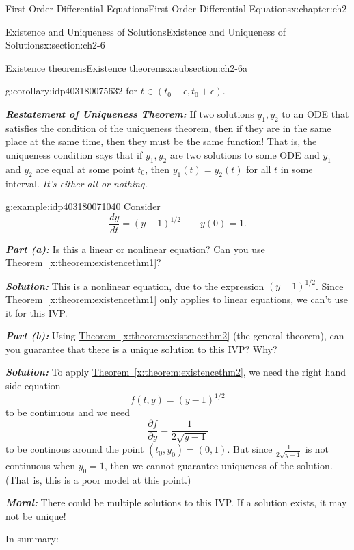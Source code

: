 \documentclass[oneside,10pt,]{book}
\newcommand{\xreffont}{\relax}
\newcommand{\alert}[1]{\textbf{\textit{#1}}}
\numberwithin{equation}{section}
\numberwithin{equation}{section}
\begin{document}
\begin{chapterptx}{First Order Differential Equations}{}{First Order Differential Equations}{}{}{x:chapter:ch2}
\begin{sectionptx}{Existence and Uniqueness of Solutions}{}{Existence and Uniqueness of Solutions}{}{}{x:section:ch2-6}
\begin{subsectionptx}{Existence theorems}{}{Existence theorems}{}{}{x:subsection:ch2-6a}
\begin{corollary}{}{}{g:corollary:idp403180075632}
for \(t\in\left(t_{0}-\epsilon,t_{0}+\epsilon\right)\).%
\end{corollary}
\alert{Restatement of Uniqueness Theorem:} If two solutions \(y_{1},y_{2}\) to an ODE that satisfies the condition of the uniqueness theorem, then if they are in the same place at the same time, then they must be the same function! That is, the uniqueness condition says that if \(y_{1},y_{2}\) are two solutions to some ODE and \(y_{1}\) and \(y_{2}\) are equal at some point \(t_{0}\), then \(y_{1}(t)=y_{2}(t)\) for all \(t\) in some interval. \emph{It's either all or nothing.}%
\begin{example}{}{g:example:idp403180071040}%
Consider%
\begin{equation*}
\frac{dy}{dt}=(y-1)^{1/2}\qquad y(0)=1.
\end{equation*}
%
\par
\alert{Part (a):} Is this a linear or nonlinear equation? Can you use \hyperref[x:theorem:existencethm1]{Theorem~{\xreffont\ref{x:theorem:existencethm1}}}?%
\par
\alert{Solution:} This is a nonlinear equation, due to the expression \((y-1)^{1/2}\). Since \hyperref[x:theorem:existencethm1]{Theorem~{\xreffont\ref{x:theorem:existencethm1}}} only applies to linear equations, we can't use it for this IVP.%
\par
\alert{Part (b):} Using \hyperref[x:theorem:existencethm2]{Theorem~{\xreffont\ref{x:theorem:existencethm2}}} (the general theorem), can you guarantee that there is a unique solution to this IVP? Why?%
\par
\alert{Solution:} To apply \hyperref[x:theorem:existencethm2]{Theorem~{\xreffont\ref{x:theorem:existencethm2}}}, we need the right hand side equation%
\begin{equation*}
f(t,y)=(y-1)^{1/2}
\end{equation*}
to be continuous and we need%
\begin{equation*}
\frac{\partial f}{\partial y}=\frac{1}{2\sqrt{y-1}}
\end{equation*}
to be continous around the point \((t_{0},y_{0})=(0,1)\). But since \(\frac{1}{2\sqrt{y-1}}\) is not continuous when \(y_{0}=1\), then we cannot guarantee uniqueness of the solution. (That is, this is a poor model at this point.)%
\par
\alert{Moral:} There could be multiple solutions to this IVP. If a solution exists, it may not be unique!%
\end{example}
In summary:%
\begin{itemize}[label=\textbullet]

\end{itemize}
\end{subsectionptx}
\end{sectionptx}
\end{chapterptx}
\end{document}
